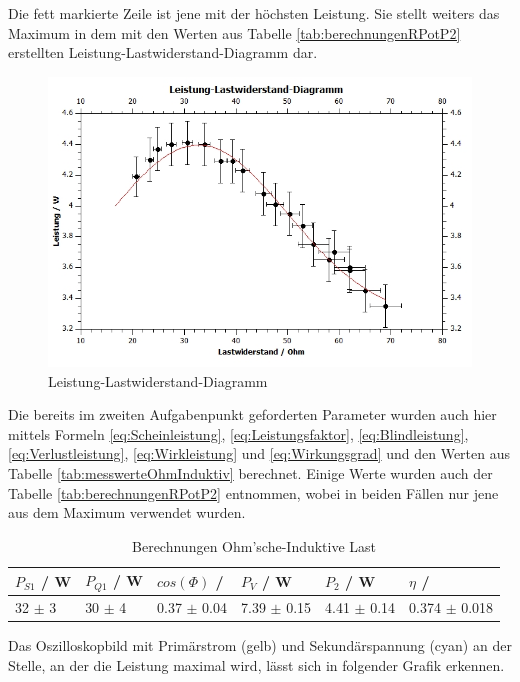 \documentclass[12pt,a4paper,twoside]{article}
\begin{document}
\noindent
Die fett markierte Zeile ist jene mit der höchsten Leistung. Sie stellt weiters das Maximum in dem mit den Werten aus Tabelle \ref{tab:berechnungenRPotP2} erstellten Leistung-Lastwiderstand-Diagramm dar.

\begin{figure}[H]
    \centering
    \includegraphics[width=0.6\linewidth, angle=0]{nudes/Leistung-Lastwiderstand-Diagramm.jpg}
    \caption{Leistung-Lastwiderstand-Diagramm}
    \label{fig:LeistungLastwiderstandDiagramm}
\end{figure}

\noindent
Die bereits im zweiten Aufgabenpunkt geforderten Parameter wurden auch hier mittels Formeln \ref{eq:Scheinleistung}, \ref{eq:Leistungsfaktor}, \ref{eq:Blindleistung}, \ref{eq:Verlustleistung}, \ref{eq:Wirkleistung} und \ref{eq:Wirkungsgrad} und den Werten aus Tabelle \ref{tab:messwerteOhmInduktiv} berechnet. Einige Werte wurden auch der Tabelle \ref{tab:berechnungenRPotP2} entnommen, wobei in beiden Fällen nur jene aus dem Maximum verwendet wurden.

\begin{table}[H]
    \centering
    \caption{Berechnungen Ohm'sche-Induktive Last}
    \label{tab:BerechnungenOhmInd}
    \begin{tabular}{| l | l | l | l | l | l |}
        \hline
        $P_{S1}$ / W & $P_{Q1}$ / W & $cos(\Phi)$ / & $P_{V}$ / W & $P_{2}$ / W & $\eta$ / \\
        \hline
        32 $\pm$ 3 & 30 $\pm$ 4 & 0.37 $\pm$ 0.04 & 7.39 $\pm$ 0.15 & 4.41 $\pm$ 0.14 & 0.374 $\pm$ 0.018 \\
        \hline
    \end{tabular}
\end{table}

\noindent
Das Oszilloskopbild mit Primärstrom (gelb) und Sekundärspannung (cyan) an der Stelle, an der die Leistung maximal wird, lässt sich in folgender Grafik erkennen.
\end{document}
